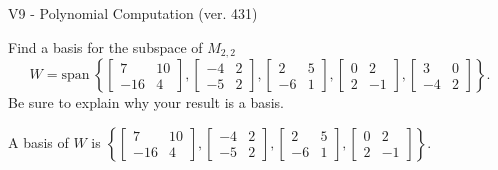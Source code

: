 \begin{exercise}
  \begin{exerciseTitle}V9 - Polynomial Computation (ver. 431)\end{exerciseTitle}
  \begin{exerciseStatement}
    Find a basis for the subspace of \(M_{2,2}\) 
\[W=\mathrm{span}\ \left\{\left[\begin{array}{cc}
7 & 10 \\
-16 & 4
\end{array}\right] , \left[\begin{array}{cc}
-4 & 2 \\
-5 & 2
\end{array}\right] , \left[\begin{array}{cc}
2 & 5 \\
-6 & 1
\end{array}\right] , \left[\begin{array}{cc}
0 & 2 \\
2 & -1
\end{array}\right] , \left[\begin{array}{cc}
3 & 0 \\
-4 & 2
\end{array}\right]\right\}.\]
 Be sure to explain why your result is a basis.


  \end{exerciseStatement}
  \begin{exerciseAnswer}
   A basis of \(W\) is  \(\left\{\left[\begin{array}{cc}
7 & 10 \\
-16 & 4
\end{array}\right] , \left[\begin{array}{cc}
-4 & 2 \\
-5 & 2
\end{array}\right] , \left[\begin{array}{cc}
2 & 5 \\
-6 & 1
\end{array}\right] , \left[\begin{array}{cc}
0 & 2 \\
2 & -1
\end{array}\right]\right\}\).
  


  \end{exerciseAnswer}
\end{exercise}
